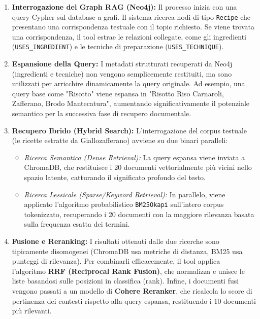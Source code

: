 \documentclass[11pt, a4paper]{article}
\begin{document}
\begin{enumerate}
    \item \textbf{Interrogazione del Graph RAG (Neo4j):} Il processo inizia con una query Cypher sul database a grafi. Il sistema ricerca nodi di tipo \texttt{Recipe} che presentano una corrispondenza testuale con il topic richiesto. Se viene trovata una corrispondenza, il tool estrae le relazioni collegate, come gli ingredienti (\texttt{USES\_INGREDIENT}) e le tecniche di preparazione (\texttt{USES\_TECHNIQUE}).
    
    \item \textbf{Espansione della Query:} I metadati strutturati recuperati da Neo4j (ingredienti e tecniche) non vengono semplicemente restituiti, ma sono utilizzati per arricchire dinamicamente la query originale. Ad esempio, una query base come "Risotto" viene espansa in "Risotto Riso Carnaroli, Zafferano, Brodo Mantecatura", aumentando significativamente il potenziale semantico per la successiva fase di recupero documentale.
    
    \item \textbf{Recupero Ibrido (Hybrid Search):} L'interrogazione del corpus testuale (le ricette estratte da Giallozafferano) avviene su due binari paralleli:
    \begin{itemize}
        \item \textit{Ricerca Semantica (Dense Retrieval):} La query espansa viene inviata a ChromaDB, che restituisce i 20 documenti vettorialmente più vicini nello spazio latente, catturando il significato profondo del testo.
        \item \textit{Ricerca Lessicale (Sparse/Keyword Retrieval):} In parallelo, viene applicato l'algoritmo probabilistico \texttt{BM25Okapi} sull'intero corpus tokenizzato, recuperando i 20 documenti con la maggiore rilevanza basata sulla frequenza esatta dei termini.
    \end{itemize}
    
    \item \textbf{Fusione e Reranking:} I risultati ottenuti dalle due ricerche sono tipicamente disomogenei (ChromaDB usa metriche di distanza, BM25 usa punteggi di rilevanza). Per combinarli efficacemente, il tool applica l'algoritmo \textbf{RRF (Reciprocal Rank Fusion)}, che normalizza e unisce le liste basandosi sulle posizioni in classifica (rank). Infine, i documenti fusi vengono passati a un modello di \textbf{Cohere Reranker}, che ricalcola lo score di pertinenza dei contesti rispetto alla query espansa, restituendo i 10 documenti più rilevanti.
\end{enumerate}
\end{document}
